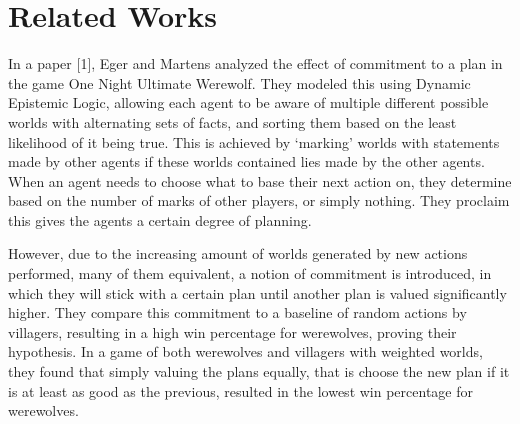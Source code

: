 \section{Related Works}
In a paper [1], Eger and Martens analyzed the effect of commitment to a plan in
the game One Night Ultimate Werewolf. They modeled this using Dynamic Epistemic
Logic, allowing each agent to be aware of multiple different possible worlds
with alternating sets of facts, and sorting them based on the least likelihood
of it being true. This is achieved by ‘marking’ worlds with statements made by
other agents if these worlds contained lies made by the other agents. When an
agent needs to choose what to base their next action on, they determine based
on the number of marks of other players, or simply nothing. They proclaim this
gives the agents a certain degree of planning.

However, due to the increasing amount of worlds generated by new actions
performed, many of them equivalent, a notion of commitment is introduced, in
which they will stick with a certain plan until another plan is valued
significantly higher. They compare this commitment to a baseline of random
actions by villagers, resulting in a high win percentage for werewolves,
proving their hypothesis. In a game of both werewolves and villagers with
weighted worlds, they found that simply valuing the plans equally, that is
choose the new plan if it is at least as good as the previous, resulted in the
lowest win percentage for werewolves.

